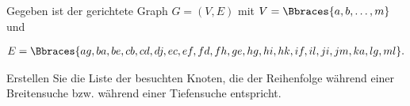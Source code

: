 
\begin{exercise}

Gegeben ist der gerichtete Graph $G = (V, E)$ mit $V = \Bbraces{a, b, \dots, m}$ und

\begin{align*}
  E = \Bbraces{ag, ba, be, cb, cd, dj, ec, ef, fd, fh, ge, hg, hi, hk, if, il, ji, jm, ka, lg, ml}.
\end{align*}

Erstellen Sie die Liste der besuchten Knoten, die der Reihenfolge während einer Breitensuche bzw. während einer Tiefensuche entspricht.

\end{exercise}


